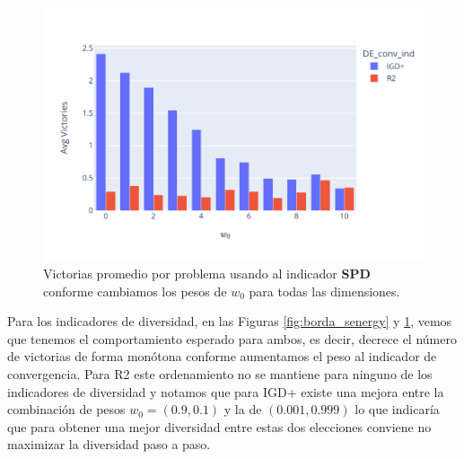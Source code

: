\begin{figure} [H]
    \centering
    \includegraphics[width=\textwidth]{Figuras/borda_obj_ind_spd.pdf}
\caption[Conteo de borda IGD+]{Victorias promedio por problema usando al indicador \textbf{SPD} conforme cambiamos los pesos de $w_0$ para todas las dimensiones.}
\label{fig:borda_spd}
\end{figure}



Para los indicadores de diversidad, en las Figuras \ref{fig:borda_senergy} y \ref{fig:borda_spd}, vemos que tenemos el comportamiento esperado para ambos, es decir, decrece el número de victorias de forma monótona conforme aumentamos el peso al indicador de convergencia. Para R2 este ordenamiento no se mantiene para ninguno de los indicadores de diversidad y notamos que para IGD+ existe una mejora entre la combinación de pesos $w_0=(0.9,0.1)$ y la de $(0.001,0.999)$ lo que indicaría que para obtener una mejor diversidad entre estas dos elecciones conviene no maximizar la diversidad paso a paso.  





